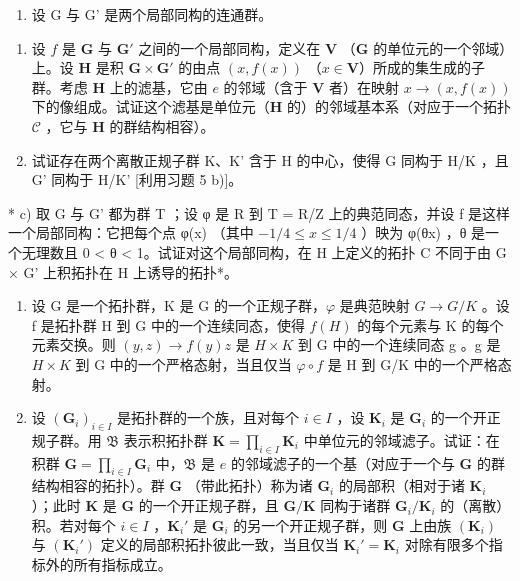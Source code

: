 \begin{enumerate}
\def\labelenumi{\arabic{enumi})}
\setcounter{enumi}{23}
\tightlist
\item
  设 G 与 G' 是两个局部同构的连通群。
\end{enumerate}

\begin{enumerate}
\def\labelenumi{\alph{enumi})}
\item
  设 \(f\) 是 \(\mathbf{G}\) 与 \(\mathbf{G}'\) 之间的一个局部同构，定义在 \(\mathbf{V}\) （\(\mathbf{G}\) 的单位元的一个邻域）上。设 \(\mathbf{H}\) 是积 \(\mathbf{G} \times \mathbf{G}'\) 的由点 \((x, f(x))\) （\(x \in \mathbf{V}\)）所成的集生成的子群。考虑 \(\mathbf{H}\) 上的滤基，它由 \(e\) 的邻域（含于 \(\mathbf{V}\) 者）在映射 \(x \to (x, f(x))\) 下的像组成。试证这个滤基是单位元（\(\mathbf{H}\) 的）的邻域基本系（对应于一个拓扑 \(\mathcal{C}\) ，它与 \(\mathbf{H}\) 的群结构相容）。
\item
  试证存在两个离散正规子群 K、K' 含于 H 的中心，使得 G 同构于 H/K ，且 G' 同构于 H/K' {[}利用习题 5 b){]}。
\end{enumerate}

* c) 取 G 与 G' 都为群 T ；设 φ 是 R 到 T = R/Z 上的典范同态，并设 f 是这样一个局部同构：它把每个点 φ(x) （其中 \(-1/4 \leqslant x \leqslant 1/4\) ）映为 φ(θx) ，θ 是一个无理数且 0 \textless{} θ \textless{} 1。试证对这个局部同构，在 H 上定义的拓扑 C 不同于由 G × G' 上积拓扑在 H 上诱导的拓扑*。

\begin{enumerate}
\def\labelenumi{\arabic{enumi})}
\setcounter{enumi}{24}
\item
  设 G 是一个拓扑群，K 是 G 的一个正规子群，\(\varphi\) 是典范映射 \(G \rightarrow G/K\) 。设 f 是拓扑群 H 到 G 中的一个连续同态，使得 \(f(H)\) 的每个元素与 K 的每个元素交换。则 \((y, z) \rightarrow f(y)z\) 是 \(H \times K\) 到 G 中的一个连续同态 g 。g 是 \(H \times K\) 到 G 中的一个严格态射，当且仅当 \(\varphi \circ f\) 是 H 到 G/K 中的一个严格态射。
\item
  设 \((\mathbf{G}_i)_{i\in I}\) 是拓扑群的一个族，且对每个 \(i\in I\) ，设 \(\mathbf{K}_i\) 是 \(\mathbf{G}_i\) 的一个开正规子群。用 \(\mathfrak{B}\) 表示积拓扑群 \(\mathbf{K} = \prod_{i\in I}\mathbf{K}_i\) 中单位元的邻域滤子。试证：在积群 \(\mathbf{G} = \prod_{i\in I}\mathbf{G}_i\) 中，\(\mathfrak{B}\) 是 \(e\) 的邻域滤子的一个基（对应于一个与 \(\mathbf{G}\) 的群结构相容的拓扑）。群 \(\mathbf{G}\) （带此拓扑）称为诸 \(\mathbf{G}_i\) 的局部积（相对于诸 \(\mathbf{K}_i\) ）；此时 \(\mathbf{K}\) 是 \(\mathbf{G}\) 的一个开正规子群，且 \(\mathbf{G} / \mathbf{K}\) 同构于诸群 \(\mathbf{G}_i / \mathbf{K}_i\) 的（离散）积。若对每个 \(i\in I\) ，\(\mathbf{K}_i'\) 是 \(\mathbf{G}_i\) 的另一个开正规子群，则 \(\mathbf{G}\) 上由族 \((\mathbf{K}_i)\) 与 \((\mathbf{K}_i')\) 定义的局部积拓扑彼此一致，当且仅当 \(\mathbf{K}_i' = \mathbf{K}_i\) 对除有限多个指标外的所有指标成立。
\end{enumerate}


